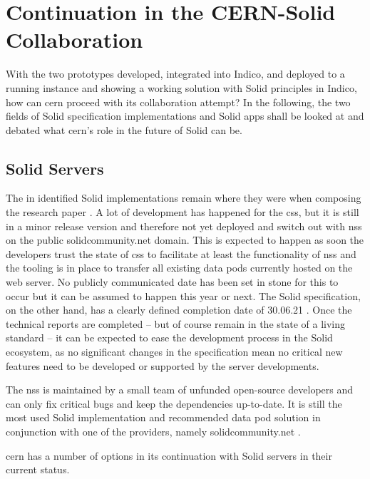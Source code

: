 \section{Continuation in the CERN-Solid Collaboration}

With the two prototypes developed, integrated into Indico, and deployed to a running instance and showing a working solution with Solid principles in Indico, how can \gls{cern} proceed with its collaboration attempt? In the following, the two fields of Solid specification implementations and Solid apps shall be looked at and debated what \gls{cern}'s role in the future of Solid can be.

\subsection{Solid Servers}

The in \cite{cern-solid-investigation-spec} identified Solid implementations remain where they were when composing the research paper \cite{cern-solid-investigation-spec}. A lot of development has happened for the \gls{css}, but it is still in a minor release version and therefore not yet deployed and switch out with \gls{nss} on the public solidcommunity.net domain. This is expected to happen as soon the developers trust the state of \gls{css} to facilitate at least the functionality of \gls{nss} and the tooling is in place to transfer all existing data pods currently hosted on the web server. No publicly communicated date has been set in stone for this to occur but it can be assumed to happen this year or next. The Solid specification, on the other hand, has a clearly defined completion date of 30.06.21 \cite{solid-tr}. Once the technical reports are completed -- but of course remain in the state of a living standard -- it can be expected to ease the development process in the Solid ecosystem, as no significant changes in the specification mean no critical new features need to be developed or supported by the server developments.

The \gls{nss} is maintained by a small team of unfunded open-source developers and can only fix critical bugs and keep the dependencies up-to-date. It is still the most used Solid implementation and recommended data pod solution in conjunction with one of the providers, namely solidcommunity.net \cite{solid-community}.

\gls{cern} has a number of options in its continuation with Solid servers in their current status.

